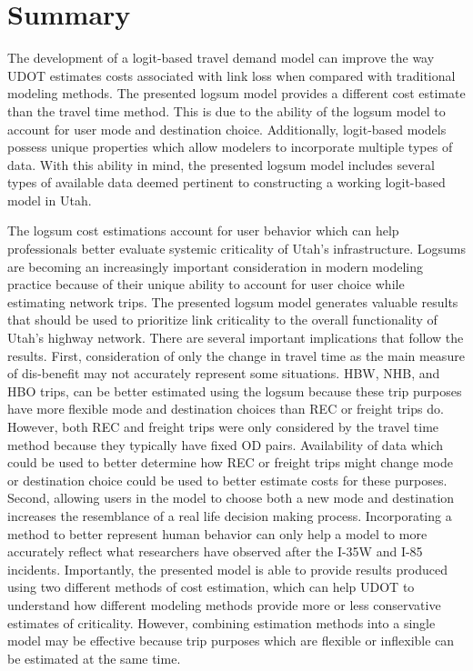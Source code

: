 \section{Summary}

The development of a logit-based travel demand model can improve the way UDOT
estimates costs associated with link loss when compared
with traditional modeling methods. The presented logsum model provides a different cost
estimate than the travel time method. This is due to the ability of the logsum
model to account for user mode and destination choice. Additionally,
logit-based models possess unique properties which allow modelers
to incorporate multiple types of data. With this ability in mind, the presented logsum model
includes several types of available data deemed pertinent to
constructing a working logit-based model in Utah.

The logsum cost estimations account for user behavior which can help professionals
better evaluate systemic criticality of Utah's infrastructure. Logsums are becoming an increasingly
important consideration in modern modeling practice because of their unique
ability to account for user choice while estimating
network trips. The presented logsum model generates valuable results that should
be used to prioritize link criticality to the overall functionality of Utah's
highway network. There are several important implications that follow the
results. First, consideration of only the change in travel time as the main measure
of dis-benefit may not accurately represent some situations. HBW, NHB, and HBO trips,
can be better estimated using the logsum because these trip purposes have more flexible
mode and destination choices than REC or freight trips do. However, both REC and
freight trips were only considered by the travel time method because they typically
have fixed OD pairs. Availability of data which could be used to better determine how
REC or freight trips might change mode or destination choice could be used to better
estimate costs for these purposes. Second, allowing users in the model
to choose both a new mode and destination increases the resemblance of a real life
decision making process. Incorporating a method to better represent human behavior
can only help a model to more accurately reflect what researchers have observed
after the I-35W and I-85 incidents. Importantly, the presented model is able to provide results produced
using two different methods of cost estimation, which can help UDOT to understand
how different modeling methods provide more or less conservative estimates of criticality.
However, combining estimation methods into a single model may be effective because trip purposes which
are flexible or inflexible can be estimated at the same time.

